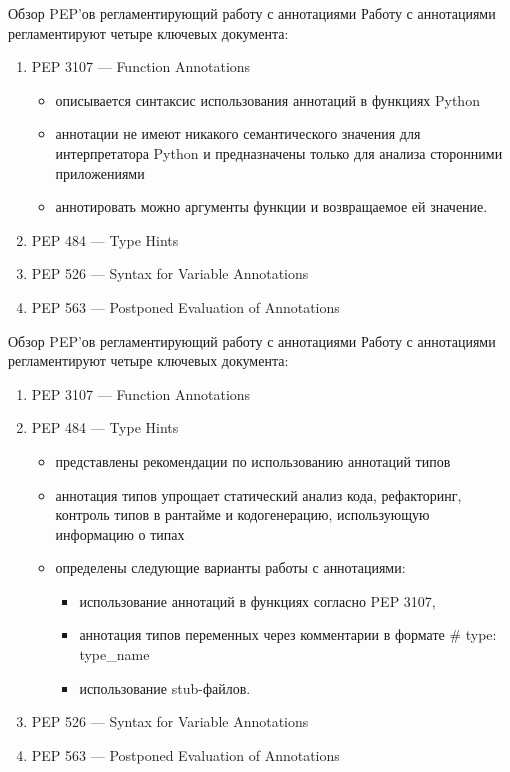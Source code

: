 \documentclass[xcolor=table]{beamer}
\begin{document}
\begin{frame}[fragile]{ Обзор PEP’ов регламентирующий работу с аннотациями}
	Работу с аннотациями регламентируют четыре ключевых документа: 
	\begin{enumerate}
		\item PEP 3107 — Function Annotations
		\begin{itemize}
			\item описывается синтаксис использования аннотаций в функциях Python
			\item аннотации не имеют никакого семантического значения для интерпретатора Python и предназначены только для анализа сторонними приложениями
			\item аннотировать можно аргументы функции и возвращаемое ей значение.
		\end{itemize}
		\item PEP 484 — Type Hints
		\item PEP 526 — Syntax for Variable Annotations
		\item PEP 563 — Postponed Evaluation of Annotations
	\end{enumerate}
\end{frame}

\begin{frame}[fragile]{ Обзор PEP’ов регламентирующий работу с аннотациями}
	Работу с аннотациями регламентируют четыре ключевых документа: 
	\begin{enumerate}
		\item PEP 3107 — Function Annotations
		\item PEP 484 — Type Hints
		\begin{itemize}
			\item представлены рекомендации по использованию аннотаций типов
			\item аннотация типов упрощает статический анализ кода, рефакторинг, контроль типов в рантайме и кодогенерацию, использующую информацию о типах
			\item определены следующие варианты работы с аннотациями:
			\begin{itemize}
				\item использование аннотаций в функциях согласно PEP 3107, 
				\item аннотация типов переменных через комментарии в формате \# type: type\_name
				\item использование stub-файлов.			
			\end{itemize}
		\end{itemize}		
		\item PEP 526 — Syntax for Variable Annotations
		\item PEP 563 — Postponed Evaluation of Annotations
	\end{enumerate}
\end{frame}
\end{document}
